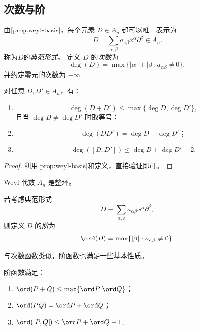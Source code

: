 \subsection{次数与阶}

\begin{definition}
    由\ref{prop:weyl-basis}，每个元素 $D\in A_n$ 都可以唯一表示为
    \begin{equation*}
        D=\sum_{\alpha,\beta}
        a_{\alpha\beta}x^\alpha\partial^\beta\in A_n.
    \end{equation*}
    称为$D$的\emph{典范形式}。
    定义 $D$ 的\emph{次数}为
    \[
        \deg(D)=\max\{|\alpha|+|\beta|:
        a_{\alpha\beta}\neq0\},
    \]
    并约定零元的次数为 $-\infty$.
\end{definition}

\begin{theorem}
    对任意 $D,D'\in A_n$，有：
    \begin{enumerate}
        \item
              \[
                  \deg(D+D')\le\max\{\deg D,\deg D'\},
              \]
              且当 $\deg D\neq\deg D'$ 时取等号；
        \item
              \[
                  \deg(DD')=\deg D+\deg D'；
              \]
        \item
              \[
                  \deg([D,D'])\le\deg D+\deg D'-2.
              \]
    \end{enumerate}
    \begin{proof}
        利用\ref{prop:weyl-basis}和定义，直接验证即可。
    \end{proof}
\end{theorem}

\begin{corollary}
    Weyl 代数 $A_n$ 是整环。
\end{corollary}

\begin{definition}
    若考虑典范形式
    \[
        D=\sum_{\alpha,\beta}
        a_{\alpha\beta}x^\alpha\partial^\beta,
    \]
    则定义 $D$ 的\emph{阶}为
    \[
        \ord(D)=\max\{|\beta|:a_{\alpha\beta}\neq0\}.
    \]
\end{definition}
与次数函数类似，阶函数也满足一些基本性质。
\begin{proposition}
    阶函数满足：
    \begin{enumerate}
        \item
              $\ord(P+Q)\le\max\{\ord P,\ord Q\}$；
        \item
              $\ord(PQ)=\ord P+\ord Q$；
        \item
              $\ord([P,Q])\le\ord P+\ord Q-1$.
    \end{enumerate}
\end{proposition}

